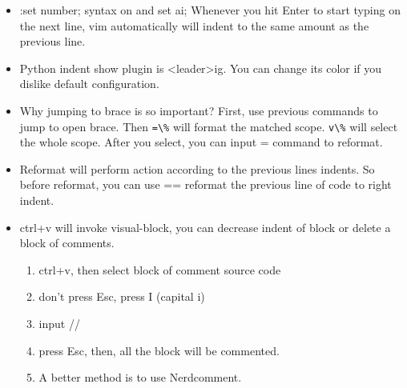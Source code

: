 \documentclass[paper=8.5in:11in, twoside, 12pt, pagesize=pdftex]{book}
\begin{document}
\begin{itemize}
\begin{enumerate}
						\item Use :set path, then you can jump to header file by "gf" command, then use <C-\^{}> to return. A more useful command is <C-w>f command, it will open header file in a new windows.  
						
						\item First, you need to use Nerdtree to get all directory information, Then set path+=<paste directory here>. In the end, you can use gf command to open header file.
						
						\item Use F8 to open tagbar windows, it shows all global variable and function in this files. It's only for current open files. If you want to use Ctrl+], you need to use ctags command to produce tags file. You can see in ctags section.
						
						\item If you want to search withing specific directory, you can use easyGrep tool. Detail can be seen esayGrep section.
					\end{enumerate}
					
					\item :set number; syntax on and set ai;  Whenever you hit Enter to start typing on the next line, vim automatically will indent to the same amount as the previous line.
					
					\item Python indent show plugin is <leader>ig. You can change its color if you dislike default configuration. 				
					
					\item Why jumping to brace is so important? First, use previous commands to jump to open brace. Then \verb!=\%! will format the matched scope. \verb=v\%= will select the whole scope.  After you select, you can input = command to reformat.  
					
					\item Reformat will perform action according to the previous lines indents. So before reformat, you can use == reformat the previous line of code to right indent.
					
					\item ctrl+v will invoke visual-block, you can decrease indent of block or delete a block of comments. 
					\begin{enumerate}
						\item ctrl+v, then select block of comment source code 
						\item don't press Esc, press I (capital i) 
						\item input // 
						\item press Esc, then, all the block will be commented.
						\item A better method is to use Nerdcomment.
					\end{enumerate}
				\end{itemize}
				
\end{document}
